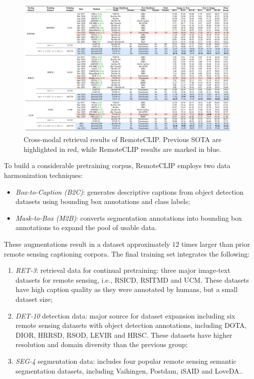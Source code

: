 \documentclass[a4paper, oneside, english]{sapthesis} %
\begin{document}
\begin{figure}[h]
    \centering
    \includegraphics[width=\textwidth]{img/remoteclip-retrieval-performance.png}
    \caption{Cross-modal retrieval results of RemoteCLIP. Previous SOTA are highlighted in red, while RemoteCLIP results are marked in blue.}
    \label{fig:remoteclip-performance}
\end{figure}

To build a considerable pretraining corpus, RemoteCLIP employs two data harmonization techniques:

\begin{itemize}
    \item \emph{Box-to-Caption (B2C)}: generates descriptive captions from object detection datasets using bounding box annotations and class labels;
    \item \emph{Mask-to-Box (M2B)}: converts segmentation annotations into bounding box annotations to expand the pool of usable data.
\end{itemize}
These augmentations result in a dataset approximately $12$ times larger than prior remote sensing captioning corpora. The final training set integrates the following:
\begin{enumerate}
    \item \emph{RET-3}: retrieval data for continual pretraining: three major image-text datasets for remote sensing, i.e., RSICD, RSITMD and UCM. These datasets have high caption quality as they were annotated by humans, but a small dataset size;
    \item \emph{DET-10} detection data: major source for dataset expansion including six remote sensing datasets with object detection annotations, including DOTA, DIOR, HRRSD, RSOD, LEVIR and HRSC. These datasets have higher resolution and domain diversity than the previous group;
    \item \emph{SEG-4} segmentation data: includes four popular remote sensing semantic segmentation datasets, including Vaihingen, Postdam, iSAID and LoveDA..
\end{enumerate}
\end{document}
